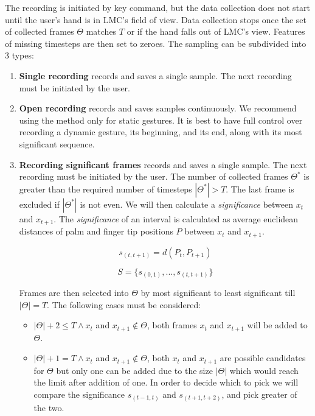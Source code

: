 The recording is initiated by key command, but the data collection does not start until the user's hand is in LMC's field of view. Data collection stops once the set of collected frames $\Theta$ matches $T$ or if the hand falls out of LMC's view. Features of missing timesteps are then set to zeroes. The sampling can be subdivided into 3 types:

\begin{enumerate}
    \item \textbf{Single recording} records and saves a single sample. The next recording must be initiated by the user.
    \item \textbf{Open recording} records and saves samples continuously. We recommend using the method only for static gestures. It is best to have full control over recording a dynamic gesture, its beginning, and its end, along with its most significant sequence.
    \item \textbf{Recording significant frames} records and saves a single sample. The next recording must be initiated by the user. The number of collected frames $\Theta^*$ is greater than the required number of timesteps $|\Theta^*| > T$. The last frame is excluded if $|\Theta^*|$ is not even. We will then calculate a \textit{significance} between $x_t$ and $x_{t+1}$.
    The \textit{significance} of an interval is calculated as average euclidean distances of palm and finger tip positions $P$ between $x_t$ and $x_{t+1}$.

    \begin{equation}
        {s_{(t, t+1)} = d(P_{t}, P_{t+1})}
    \end{equation}

    \begin{equation}
        {S = \{s_{(0, 1)}, ...,s_{(t, t+1)}\}}
    \end{equation}

    Frames are then selected into $\Theta$ by most significant to least significant till $|\Theta| = T$. The following cases must be considered:
    \begin{itemize}
        \item $|\Theta| + 2 \leq T \land x_t$ and $x_{t+1} \notin \Theta$, both frames $x_t$ and $x_{t+1}$ will be added to $\Theta$.
        \item $|\Theta| + 1 = T \land x_t$ and $x_{t+1} \notin \Theta$, both $x_t$ and $x_{t+1}$ are possible candidates for $\Theta$ but only one can be added due to the size $|\Theta|$ which would reach the limit after addition of one. In order to decide which to pick we will compare the significance $s_{(t-1, t)}$ and $s_{(t+1, t+2)}$, and pick greater of the two.
        

\end{itemize}
\end{enumerate}
